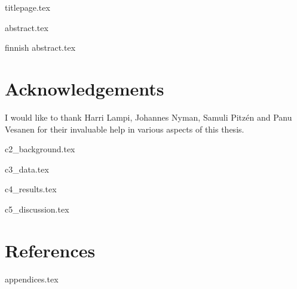 \documentclass[a4paper,11pt]{article}
\title{\mytitle}
\author{\myname}
\date{11.10.2020} %
\renewcommand*\&{and}                       %
\begin{document}
{titlepage.tex}

\newpage
{abstract.tex}

\newpage
\begin{otherlanguage*}{finnish}
{abstract.tex}
\end{otherlanguage*}

\newpage
{}
\thispagestyle{empty} %
\renewcommand*\contentsname{Table of contents} %
\tableofcontents

\newpage
\thispagestyle{empty}
\listoffigures

\thispagestyle{empty}
\listoftables
\thispagestyle{empty}

\newpage
\printglossary[type=\acronymtype,nonumberlist,title=List of abbreviations]
\thispagestyle{empty}

\newpage
\section*{Acknowledgements}
\thispagestyle{empty}
I would like to thank Harri Lampi, Johannes Nyman, Samuli Pitzén and Panu Vesanen for their invaluable help in various aspects of this thesis.

\newpage
\setcounter{page}{1} %


\newpage
{c2_background.tex}%

\newpage
{c3_data.tex}%

\newpage
{c4_results.tex}%

\newpage
{c5_discussion.tex}%

\newpage
\label{myLastPage} %
\section{References}
\renewcommand{\refname}{} %


\newpage
\begin{appendices}
    \captionsetup[figure]{list=no}
    \captionsetup[table]{list=no}
    {appendices.tex}%
\end{appendices}
\end{document}
